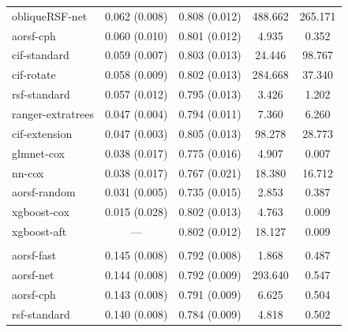 \documentclass{article}\usepackage[]{graphicx}\usepackage[]{xcolor}
\newenvironment{knitrout}{}{} %
\begin{document}
\begin{knitrout}
\begin{longtable}[t]{lcccc}
\hspace{1em}obliqueRSF-net & 0.062 (0.008) & 0.808 (0.012) & 488.662 & 265.171\\
\hspace{1em}aorsf-cph & 0.060 (0.010) & 0.801 (0.012) & 4.935 & 0.352\\
\hspace{1em}cif-standard & 0.059 (0.007) & 0.803 (0.013) & 24.446 & 98.767\\
\hspace{1em}cif-rotate & 0.058 (0.009) & 0.802 (0.013) & 284.668 & 37.340\\
\hspace{1em}rsf-standard & 0.057 (0.012) & 0.795 (0.013) & 3.426 & 1.202\\
\hspace{1em}ranger-extratrees & 0.047 (0.004) & 0.794 (0.011) & 7.360 & 6.260\\
\hspace{1em}cif-extension & 0.047 (0.003) & 0.805 (0.013) & 98.278 & 28.773\\
\hspace{1em}glmnet-cox & 0.038 (0.017) & 0.775 (0.016) & 4.907 & 0.007\\
\hspace{1em}nn-cox & 0.038 (0.017) & 0.767 (0.021) & 18.380 & 16.712\\
\hspace{1em}aorsf-random & 0.031 (0.005) & 0.735 (0.015) & 2.853 & 0.387\\
\hspace{1em}xgboost-cox & 0.015 (0.028) & 0.802 (0.013) & 4.763 & 0.009\\
\hspace{1em}xgboost-aft & --- & 0.802 (0.012) & 18.127 & 0.009\\
\addlinespace[0.3em]
\multicolumn{5}{l}{\textit{\textbf{MESA; death, n = 6793, p = 48}}}\\
\hline
\hspace{1em}aorsf-fast & 0.145 (0.008) & 0.792 (0.008) & 1.868 & 0.487\\
\hspace{1em}aorsf-net & 0.144 (0.008) & 0.792 (0.009) & 293.640 & 0.547\\
\hspace{1em}aorsf-cph & 0.143 (0.008) & 0.791 (0.009) & 6.625 & 0.504\\
\hspace{1em}rsf-standard & 0.140 (0.008) & 0.784 (0.009) & 4.818 & 0.502\\

\end{longtable}
\end{knitrout}
\end{document}
